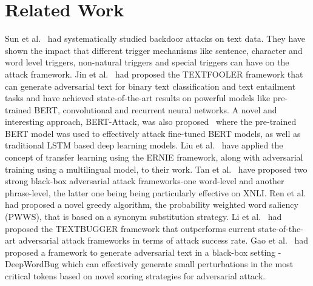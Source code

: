 \documentclass[sigconf]{acmart}
\begin{document}
\section{Related Work}
Sun et al.~\cite{sun2020natural} had systematically studied backdoor attacks on text data. They have shown the impact that different trigger mechanisms like sentence, character and word level triggers, non-natural triggers and special triggers can have on the attack framework. Jin et al.~\cite{jin2020bert} had proposed the TEXTFOOLER framework that can generate adversarial text for binary text classification and text entailment tasks and have achieved state-of-the-art results on powerful models like pre-trained BERT, convolutional and recurrent neural networks. 
A novel and interesting approach, BERT-Attack, was also proposed~\cite{li2020bert} where the pre-trained BERT model was used to effectively attack fine-tuned BERT models, as well as traditional LSTM based deep learning models. Liu et al.~\cite{liu2020kk2018} have applied the concept of transfer learning using the ERNIE framework, along with adversarial training using a multilingual model, to their work. Tan et al.~\cite{tan2021code} have proposed two strong black-box adversarial attack frameworks-one word-level and another phrase-level, the latter one being being particularly effective on XNLI.
Ren et al.~\cite{ren2019generating} had proposed a novel greedy algorithm, the probability weighted word saliency (PWWS), that is based on a synonym substitution strategy. 
Li et al.~\cite{li2018textbugger} had proposed the TEXTBUGGER framework that outperforms current state-of-the-art adversarial attack frameworks in terms of attack success rate. 
Gao et al.~\cite{gao2018black} had proposed a framework to generate adversarial text in a black-box setting - DeepWordBug which can effectively generate small perturbations in the most critical tokens based on novel scoring strategies for adversarial attack.
\end{document}
